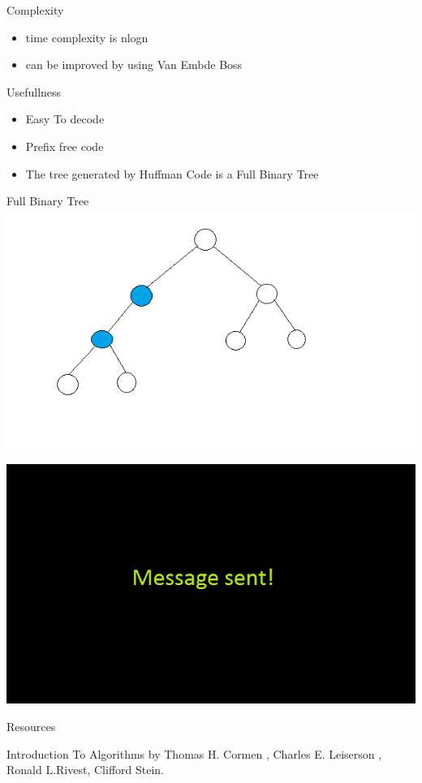 \documentclass[12pt]{beamer}
\begin{document}
\begin{frame} {Complexity}
	\begin{itemize}
		\item time complexity is {\color{orange}nlogn}
		\item can be improved by using 	{\color{orange}Van Embde Boss}
	\end{itemize}
\end{frame}
\begin{frame} {Usefullness}
\begin{itemize}
	\pause
	\item Easy To decode
	\pause
	\item Prefix free code
	\pause
	\item The tree generated by Huffman Code is a Full Binary Tree 
\end{itemize}
\end{frame}


\begin{frame} {Full Binary Tree}
\includegraphics[scale=0.5]{full}
\end{frame}


\begin{frame}
		\includegraphics[scale=0.6]{sent}
\end{frame}

\begin{frame} {Resources}
\begin{thebibliography}
\bibitem Introduction To Algorithms by Thomas H. Cormen , Charles E. Leiserson , Ronald L.Rivest, Clifford Stein.
\end{thebibliography} 
\end{frame}
\end{document}
